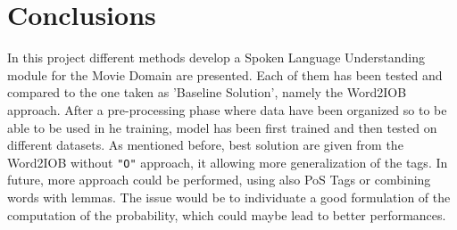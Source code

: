 \documentclass[11pt,a4paper]{article}
\begin{document}
\section{Conclusions}

In this project different methods develop a Spoken Language Understanding module for the Movie Domain are presented. Each of them has been tested and compared to the one taken as 'Baseline Solution', namely the Word2IOB approach. After a pre-processing phase where data have been organized so to be able to be used in he training, model has been first trained and then tested on different datasets. As mentioned before, best solution are given from the Word2IOB without {\tt "O"} approach, it allowing more generalization of the tags. In future, more approach could be performed, using also PoS Tags or combining words with lemmas. The issue would be to individuate a good formulation of the computation of the probability, which could maybe lead to better performances.


%
%


\end{document}
